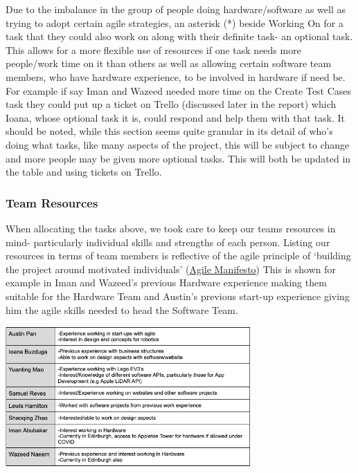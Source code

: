 \documentclass{article}
\begin{document}
\newline
Due to the imbalance in the group of people doing hardware/software as well as trying to adopt certain agile strategies, an asterisk (*) beside Working On for a task that they could also work on along with their definite task- an optional task. This allows for a more flexible use of resources if one task needs more people/work time on it than others as well as allowing certain software team members, who have hardware experience, to be involved in hardware if need be. For example if say Iman and Wazeed needed more time on the Create Test Cases task they could put up a ticket on Trello (discussed later in the report) which Ioana, whose optional task it is, could respond and help them with that task.  
\newline
It should be noted, while this section seems quite granular in its detail of who's doing what tasks, like many aspects of the project, this will be subject to change and more people may be given more optional tasks. This will both be updated in the table and using tickets on Trello. 
\subsubsection{Team Resources}
When allocating the tasks above, we took care to keep our teams resources in mind- particularly individual skills and strengths of each person. Listing our resources in terms of team members is reflective of the agile principle of ‘building the project around motivated individuals’ (\href{http://agilemanifesto.org/principles.html}{Agile Manifesto}) This is shown for example in Iman and Wazeed’s previous Hardware experience making them suitable for the Hardware Team and Austin’s previous start-up experience giving him the agile skills needed to head the Software Team. 
\begin{center}
    \includegraphics [width=0.7\textwidth]{Team Resources.png}
\end{center}
\end{document}
